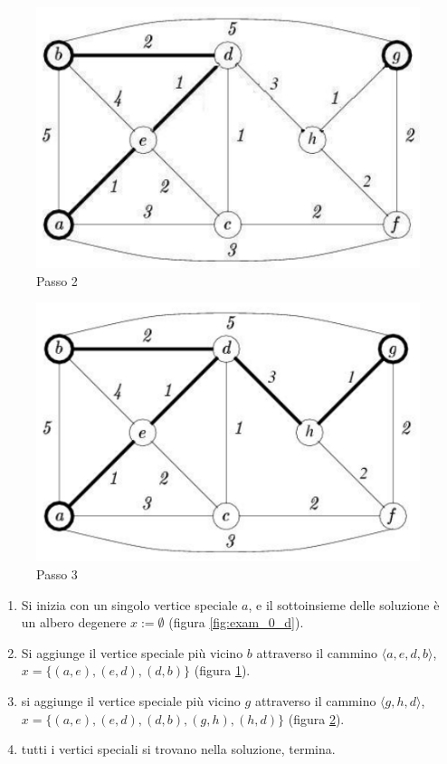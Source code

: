 \documentclass{article}
\begin{document}
\begin{figure}[H]
    \centering
    \includegraphics[scale=0.5 ]{images/examp1.png}
    \caption{Passo 2}
    \label{fig:exam_1_d}
\end{figure}

\begin{figure}[H]
    \centering
    \includegraphics[scale=0.5 ]{images/examp2.png}
    \caption{Passo 3}
    \label{fig:exam_2_d}
\end{figure}

\begin{enumerate}
    \item Si inizia con un singolo vertice speciale $a$, e il sottoinsieme delle soluzione è
          un albero degenere $x:=\emptyset$ (figura \ref{fig:exam_0_d}).
    \item Si aggiunge il vertice speciale più vicino $b$ attraverso il cammino $\langle a,e,d,b\rangle$,
          $x=\{(a,e),(e,d),(d,b)\}$ (figura \ref{fig:exam_1_d}).
    \item si aggiunge il vertice speciale più vicino $g$ attraverso il cammino $\langle g,h,d\rangle$,
          $x=\{(a,e),(e,d),(d,b),(g,h),(h,d)\}$ (figura \ref{fig:exam_2_d}).
    \item tutti i vertici speciali si trovano nella soluzione, termina.
\end{enumerate}
\end{document}
